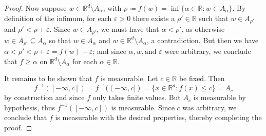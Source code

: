 \begin{proof}
	Now suppose \( w \in \mathbb{R}^{d} \setminus A_\alpha \), with \( \rho \coloneqq f(w) = \inf \{ \alpha \in \mathbb{R} : w \in A_\alpha \} \). By definition of the infimum, for each \( \varepsilon  > 0 \) there exists a \( \rho ' \in \mathbb{R} \) such that \( w \in A_{\rho '}  \) and \( \rho' < \rho + \varepsilon \). Since \( w \in A_{\rho'}\), we must have that \( \alpha < \rho ' \), as otherwise \(w \in  A_{\rho'} \subseteq A_{\alpha}   \) so that \( w \in A_\alpha \) and \( w \in \mathbb{R}^{d} \setminus A_\alpha \), a contradiction. But then we have \( \alpha < \rho' < \rho + \varepsilon = f(w) + \varepsilon   \); and since \(\alpha, w, \mbox{and } \varepsilon  \) were arbitrary, we conclude that \( f \geq \alpha \) on \( \mathbb{R}^{d} \setminus A_\alpha \) for each \( \alpha \in \mathbb{R}\).

	It remains to be shown that \( f \) is measurable. Let \( c \in \mathbb{R} \) be fixed. Then \[ f^{-1}([-\infty, c]) =  f^{-1}((-\infty, c]) = \{ x \in \mathbb{R}^{d}  : f(x) \leq c \} = A_c \] by construction and since \( f \) only takes finite values. But \( A_c \) is measurable by hypothesis, thus \( f^{-1}([-\infty, c])  \) is measurable. Since \( c \) was arbitrary, we conclude that \( f \) is measurable with the desired properties, thereby completing the proof.
\end{proof}
%
